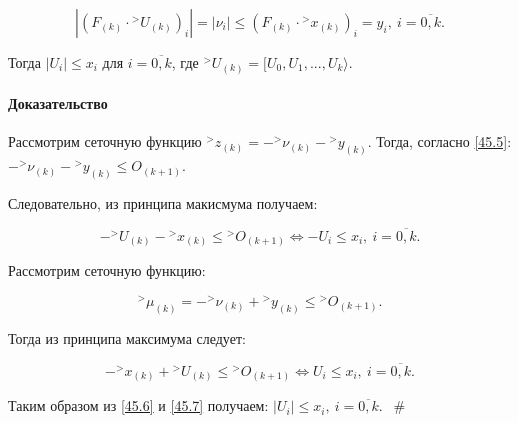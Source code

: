 \documentclass[__main__.tex]{subfiles}
\begin{document}
\begin{equation}\label{45.5}
\left| \left(F_{\left(k\right)} \cdot {}^> U_{\left(k\right)}\right)_i \right| = \left|\nu_i\right| \leq \left(F_{\left(k\right)} \cdot {}^> x_{\left(k\right)}\right)_i = y_i, \ i = \overline{0,k}.
\end{equation}

Тогда $\left|U_i\right| \leq x_i$ для $i = \overline{0,k}$, где ${}^> U_{\left(k\right)} = [ U_0, U_1, ..., U_k \rangle$.

\paragraph{Доказательство}

Рассмотрим сеточную функцию ${}^> z_{\left(k\right)} = - {}^> \nu_{\left(k\right)} - {}^> y_{\left(k\right)}$. Тогда, согласно \ref{45.5}: $- {}^>\nu_{\left(k\right)} - {}^> y_{\left(k\right)}\leq O_{\left(k+1\right)}$. 

Следовательно, из принципа макисмума получаем:

\begin{equation} \label{45.6}
- {}^> U_{\left(k\right)} - {}^> x_{\left(k\right)} \leq {}^> O_{\left(k+1\right)} \Leftrightarrow - U_i \leq x_i, \ i = \overline{0,k}.
\end{equation}

Рассмотрим сеточную функцию:

$$
{}^> \mu_{\left(k\right)} = - {}^> \nu_{\left(k\right)} + {}^> y_{\left(k\right)} \leq {}^> O_{\left(k+1\right)}.
$$

Тогда из принципа максимума следует:

\begin{equation}\label{45.7}
- {}^> x_{\left(k\right)} + {}^> U_{\left(k\right)} \leq {}^> O_{\left(k+1\right)} \Leftrightarrow U_i \leq x_i, \ i= \overline{0,k}.
\end{equation}

Таким образом из \ref{45.6} и \ref{45.7} получаем: $\left|U_i\right| \leq x_i, \ i = \overline{0,k}$. $\ \ \#$
\end{document}

